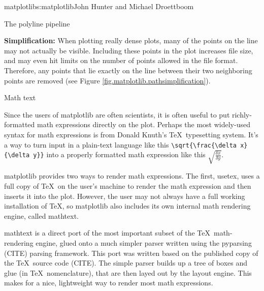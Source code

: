 \begin{aosachapter}{matplotlib}{s:matplotlib}{John Hunter and Michael Droettboom}
\begin{aosasect1}{The polyline pipeline}
\begin{aosaenumerate}
\item \textbf{Simplification:} When plotting really dense plots, many
  of the points on the line may not actually be visible.  Including
  these points in the plot increases file size, and may even hit
  limits on the number of points allowed in the file format.
  Therefore, any points that lie exactly on the line between their two
  neighboring points are removed (see Figure
  \ref{fig.matplotlib.pathsimplification}).

\end{aosaenumerate}



\end{aosasect1}

\begin{aosasect1}{Math text}

Since the users of matplotlib are often scientists, it is often useful
to put richly-formatted math expressions directly on the plot.
Perhaps the most widely-used syntax for math expressions is from
Donald Knuth's \TeX\ typesetting system.  It's a way to turn input in
a plain-text language like this
\verb+\sqrt{\frac{\delta x}{\delta y}}+ into a properly formatted math
expression like this $\sqrt{\frac{\delta x}{\delta y}}$.

matplotlib provides two ways to render math expressions.  The first,
usetex, uses a full copy of \TeX\ on the user's machine to render the
math expression and then inserts it into the plot.  However, the user
may not always have a full working installation of \TeX, so
matplotlib also includes its own internal math rendering engine,
called mathtext.

mathtext is a direct port of the most important subset of the
\TeX\ math-rendering engine, glued onto a much simpler parser written
using the pyparsing (CITE) parsing framework.  This port was written
based on the published copy of the \TeX\ source code (CITE).  The
simple parser builds up a tree of boxes and glue (in
\TeX\ nomenclature), that are then layed out by the layout engine.
This makes for a nice, lightweight way to render most math
expressions.


\end{aosasect1}
\end{aosachapter}
